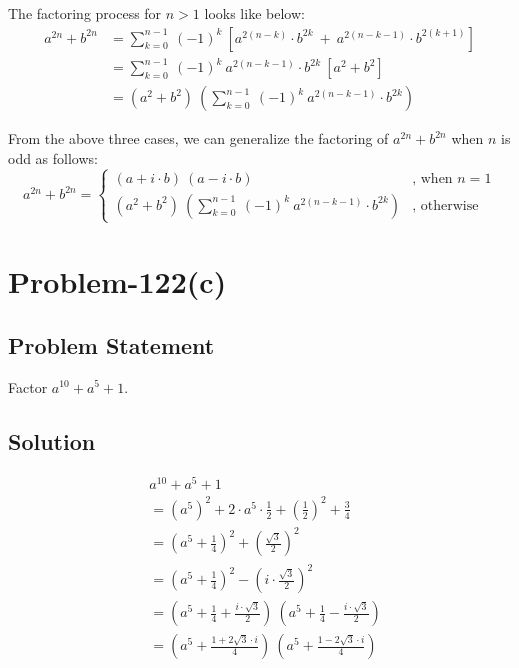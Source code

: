 \documentclass[12pt]{article}
\begin{document}
The factoring process for $n > 1$ looks like below:
\begin{equation*}
	\begin{aligned}
	a^{2n}+b^{2n} &= \sum_{k=0}^{n-1}\ (-1)^k\ \left[ a^{2(n-k)} \cdot b^{2k}\ +\ a^{2(n-k-1)}\cdot b^{2(k+1)} \right]\\
				  &= \sum_{k=0}^{n-1}\ (-1)^k\ a^{2(n-k-1)}\cdot b^{2k}\ \left[ a^2+b^2 \right]\\
				  &= \left( a^2+b^2 \right)\ \left( \sum_{k=0}^{n-1}\ (-1)^k\ a^{2(n-k-1)}\cdot b^{2k} \right)
	\end{aligned}
\end{equation*}

From the above three cases, we can generalize the factoring of $a^{2n}+b^{2n}$ when $n$ is odd as follows:
\[
a^{2n}+b^{2n} = \begin{cases} (a+i\cdot b)\ (a-i\cdot b) &\mbox{, when } n=1\\ \left( a^2+b^2 \right)\ \left( \sum_{k=0}^{n-1}\ (-1)^k\ a^{2(n-k-1)}\cdot b^{2k} \right) & \mbox{, otherwise} \end{cases}
\]
\pagebreak
\section*{Problem-122(c)}
\subsection*{Problem Statement}
Factor $a^{10} + a^5 + 1$.
\subsection*{Solution}
\begin{equation*}
	\begin{aligned}
			& a^{10} + a^5 + 1\\
			&= \left( a^5 \right)^2 + 2 \cdot a^5 \cdot \frac{1}{2} + \left( \frac{1}{2} \right)^2 + \frac{3}{4}\\
			&= \left( a^5+\frac{1}{4} \right)^2 + \left( \frac{ \sqrt{3} }{2} \right)^2\\
			&= \left( a^5+\frac{1}{4} \right)^2 - \left( i\cdot \frac{ \sqrt{3} }{2} \right)^2\\
			&= \left( a^5 + \frac{1}{4} + \frac{i\cdot \sqrt{3}}{2} \right)\ \left( a^5 + \frac{1}{4} - \frac{i\cdot \sqrt{3}}{2} \right)\\
			&= \left( a^5 + \frac{1 + 2\sqrt{3}\cdot i}{4} \right)\ \left( a^5 + \frac{1-2\sqrt{3}\cdot i}{4} \right)
	\end{aligned}
\end{equation*}
\end{document}
